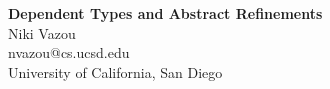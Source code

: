 \documentclass[runningheads,a4paper]{article}
\makeatletter
\newcommand{\at}{\makeatletter @\makeatother}
\newcommand\mytitle{Dependent Types and Abstract Refinements}
\newcommand\myauthor{Niki Vazou}
\newcommand\institution{University of California, San Diego}
\newcommand\myemail{nvazou\at cs.ucsd.edu}
\newcommand{\mymaketitle}{
  \begin{center}
  	{\LARGE\bf \mytitle \\ \vspace{1cm}}%
    {\Large \myauthor \\}%
 	{\large \myemail \\}%
  	{\large \institution \\}%
  \end{center}
  \par}
\makeatother
\begin{document}
\mymaketitle
\begin{abstract}

\end{abstract}








{


}
\end{document}
